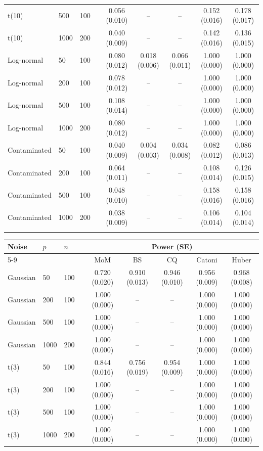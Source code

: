 \documentclass[pdflatex,sn-mathphys-num]{sn-jnl}
\theoremstyle{thmstyleone}%
\theoremstyle{thmstyletwo}%
\theoremstyle{thmstylethree}%
\begin{document}
\begin{table}[t]
\begin{tabular}{llllccccc}
t(10) & 500 & 100 & & 0.056 (0.010) & -- & -- & 0.152 (0.016) & 0.178 (0.017) \\
t(10) & 1000 & 200 & & 0.040 (0.009) & -- & -- & 0.142 (0.016) & 0.136 (0.015) \\
Log-normal & 50 & 100 & & 0.080 (0.012) & 0.018 (0.006) & 0.066 (0.011) & 1.000 (0.000) & 1.000 (0.000) \\
Log-normal & 200 & 100 & & 0.078 (0.012) & -- & -- & 1.000 (0.000) & 1.000 (0.000) \\
Log-normal & 500 & 100 & & 0.108 (0.014) & -- & -- & 1.000 (0.000) & 1.000 (0.000) \\
Log-normal & 1000 & 200 & & 0.080 (0.012) & -- & -- & 1.000 (0.000) & 1.000 (0.000) \\
Contaminated & 50 & 100 & & 0.040 (0.009) & 0.004 (0.003) & 0.034 (0.008) & 0.082 (0.012) & 0.086 (0.013) \\
Contaminated & 200 & 100 & & 0.064 (0.011) & -- & -- & 0.108 (0.014) & 0.126 (0.015) \\
Contaminated & 500 & 100 & & 0.048 (0.010) & -- & -- & 0.158 (0.016) & 0.158 (0.016) \\
Contaminated & 1000 & 200 & & 0.038 (0.009) & -- & -- & 0.106 (0.014) & 0.104 (0.014) \\
\botrule
\end{tabular}
\vspace{6pt}
\begin{tabular}{llllccccc}
\toprule
Noise & $p$ & $n$ & & \multicolumn{5}{c}{Power (SE)} \\
\cmidrule{5-9}
 & & & & MoM & BS & CQ & Catoni & Huber \\
\midrule
Gaussian & 50 & 100 & & 0.720 (0.020) & 0.910 (0.013) & 0.946 (0.010) & 0.956 (0.009) & 0.968 (0.008) \\
Gaussian & 200 & 100 & & 1.000 (0.000) & -- & -- & 1.000 (0.000) & 1.000 (0.000) \\
Gaussian & 500 & 100 & & 1.000 (0.000) & -- & -- & 1.000 (0.000) & 1.000 (0.000) \\
Gaussian & 1000 & 200 & & 1.000 (0.000) & -- & -- & 1.000 (0.000) & 1.000 (0.000) \\
t(3) & 50 & 100 & & 0.844 (0.016) & 0.756 (0.019) & 0.954 (0.009) & 1.000 (0.000) & 1.000 (0.000) \\
t(3) & 200 & 100 & & 1.000 (0.000) & -- & -- & 1.000 (0.000) & 1.000 (0.000) \\
t(3) & 500 & 100 & & 1.000 (0.000) & -- & -- & 1.000 (0.000) & 1.000 (0.000) \\
t(3) & 1000 & 200 & & 1.000 (0.000) & -- & -- & 1.000 (0.000) & 1.000 (0.000) \\

\end{tabular}
\end{table}
\end{document}
